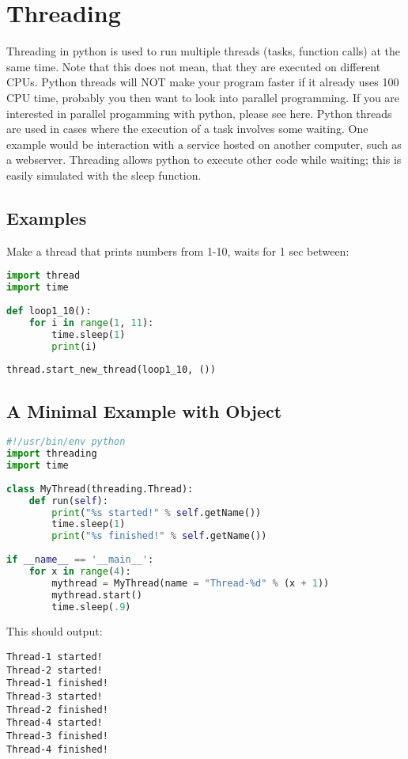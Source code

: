 \section{Threading}
Threading in python is used to run multiple threads (tasks, function calls) at
the same time. Note that this does not mean, that they are executed on different
CPUs. Python threads will NOT make your program faster if it already uses 100 %
CPU time, probably you then want to look into parallel programming. If you are
interested in parallel progamming with python, please see here.  Python threads
are used in cases where the execution of a task involves some waiting. One
example would be interaction with a service hosted on another computer, such as
a webserver. Threading allows python to execute other code while waiting; this
is easily simulated with the sleep function.

\subsection{Examples}
Make a thread that prints numbers from 1-10, waits for 1 sec between:
\lstset{basicstyle=\scriptsize, numbers=left, captionpos=b, tabsize=4}
\begin{lstlisting}[caption=Sleep Function,language={Python},
xleftmargin=15pt, label=lst:sleepfunction]
import thread
import time
 
def loop1_10():
    for i in range(1, 11):
        time.sleep(1)
        print(i)
 
thread.start_new_thread(loop1_10, ())
\end{lstlisting}

\subsection{A Minimal Example with Object}
\lstset{basicstyle=\scriptsize, numbers=left, captionpos=b, tabsize=4}
\begin{lstlisting}[caption=Class Thread Example,language={Python},
xleftmargin=15pt, label=lst:classthreadexample]
#!/usr/bin/env python
import threading
import time
 
class MyThread(threading.Thread):
    def run(self):
        print("%s started!" % self.getName())
        time.sleep(1)
        print("%s finished!" % self.getName())
 
if __name__ == '__main__':
    for x in range(4):
        mythread = MyThread(name = "Thread-%d" % (x + 1))
        mythread.start()
        time.sleep(.9)
\end{lstlisting}

This should output:
\scriptsize
\begin{verbatim}
Thread-1 started!
Thread-2 started!
Thread-1 finished!
Thread-3 started!
Thread-2 finished!
Thread-4 started!
Thread-3 finished!
Thread-4 finished! 
\end{verbatim}
\normalsize
